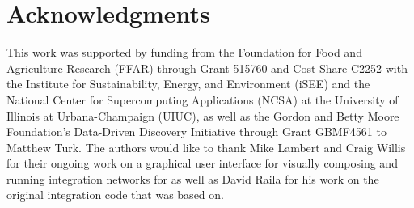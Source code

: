\documentclass[journal]{IEEEtran}
\newcommand{\todo}[1]{{\color{red}{#1}}}
\newcommand{\pkg}{{\tt \todo{cis\_interface}}{}}
\begin{document}
\section*{Acknowledgments}
\ifieee
\else
\acknowledgments
\fi
%
This work was supported by funding from the Foundation for Food and Agriculture Research (FFAR) through Grant 515760 and Cost Share C2252 with the Institute for Sustainability, Energy, and Environment (iSEE) and the National Center for Supercomputing Applications (NCSA) at the University of Illinois at Urbana-Champaign (UIUC), as well as the Gordon and Betty Moore Foundation's Data-Driven Discovery Initiative through Grant GBMF4561 to Matthew Turk. 
%
The authors would like to thank Mike Lambert and Craig Willis for their ongoing work on a graphical user interface for visually composing and running integration networks for {\pkg} as well as David Raila for his work on the original integration code that {\pkg} was based on.

\ifdraft
	
\else
	
\fi

\end{document}
